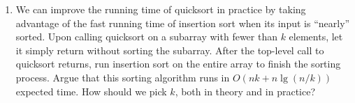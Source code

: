 \documentclass{report}
\makeatletter
\renewenvironment{framed}{%
 \def\FrameCommand##1{\hskip\@totalleftmargin
 \fboxsep=\FrameSep\fbox{##1}}%
 \MakeFramed {\advance\hsize-\width
   \@totalleftmargin\z@ \linewidth\hsize
   \@setminipage}}%
 {\par\unskip\endMakeFramed}
\DeclarePairedDelimiter{\floor}{\lfloor}{\rfloor}
\makeatother
\begin{document}
\begin{enumerate}
\begin{framed}
Combining equations $(7.2)$ and $(7.3)$, we get
\begin{equation*}
\begin{aligned}
  \text{E}[X] &=   \sum_{i = 1}^{n - 1} \sum_{j = i + 1}^{n} \frac{2}{j - i + 1}\\
              &=   \sum_{i = 1}^{\floor{n/2}} \sum_{k = 1}^{n - i} \frac{2}{k + 1} +
                   \sum_{i = \floor{n/2} + 1}^{n - 1} \sum_{k = 1}^{n - i} \frac{2}{k + 1}\\
              &\ge \sum_{i = 1}^{\floor{n/2}} \sum_{k = 1}^{n - i} \frac{2}{k + 1}\\
              &\ge \sum_{i = 1}^{\floor{n/2}} \sum_{k = 1}^{n/2} \frac{2}{k + 1}\\
              &\ge \sum_{i = 1}^{\floor{n/2}} \sum_{k = 1}^{n/2} \frac{1}{k} & \text{(since $k \ge 1$)}\\
              &= \Bigl\lfloor \frac{n}{2} \Bigr\rfloor \cdot \left(\lg \left( \frac{n}{2} \right) + O(1) \right) & \text{(approx. of harmonic number)}\\
              &= \Omega(n \lg n).
\end{aligned}
\end{equation*}
\end{framed}

\item[7.4{-}5]{We can improve the running time of quicksort in practice by
taking advantage of the fast running time of insertion sort when its input is
``nearly'' sorted. Upon calling quicksort on a subarray with fewer than
$k$ elements, let it simply return without sorting the subarray. After the
top-level call to quicksort returns, run insertion sort on the entire array
to finish the sorting process. Argue that this sorting algorithm runs in
$O(nk + n \lg(n/k))$ expected time. How should we pick $k$, both in theory and
in practice?}


\end{enumerate}
\end{document}
